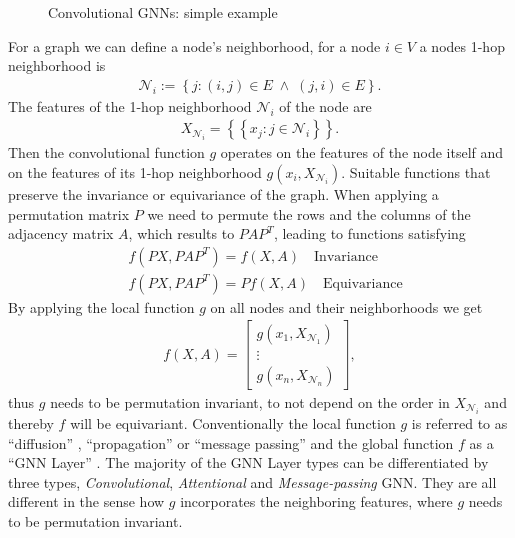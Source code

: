 \begin{figure}[htb!]
    \caption{Convolutional GNNs: simple example \label{fig: 4}}
\end{figure}

For a graph we can define a node's neighborhood, for a node $i \in V$ a
nodes 1-hop neighborhood is
\begin{align}
    \mathcal{N}_i := \left\{ j: (i,j) \in E\; \wedge \; (j, i) \in E
    \right\}.
\end{align}
The features of the 1-hop neighborhood $\mathcal{N}_i$ of the node are
\begin{align}
    X_{\mathcal{N}_i} = \left\{ \left\{ x_j: j \in \mathcal{N}_i \right\}
    \right\} .
\end{align}
Then the convolutional function $g$ operates on the features of the node
itself and on the features of its 1-hop neighborhood $g\left(x_i,
X_{\mathcal{N}_i}\right)$. Suitable functions that preserve the invariance
or equivariance of the graph. When applying a permutation matrix $P$ we need
to permute the rows and the columns of the adjacency matrix $A$, which
results to $PAP^{T}$, leading to functions satisfying
\begin{align}
    &f(PX, PAP^{T}) = f(X, A) \quad \text{Invariance}\\
    &f(PX, PAP^{T}) = Pf(X, A) \quad \text{Equivariance}
\end{align}
By applying the local function $g$ on all nodes and their neighborhoods we
get
\begin{align}
    f(X, A) =
    \begin{bmatrix}
        g(x_1, X_{\mathcal{N}_1})\\
        \vdots\\
        g(x_n, X_{\mathcal{N}_n})
    \end{bmatrix},
\end{align}
thus $g$ needs to be permutation invariant, to not depend on the order in
$X_{\mathcal{N}_i}$ and thereby $f$ will be equivariant. Conventionally the
local function $g$ is referred to as "`diffusion"' , "`propagation"' or
"`message passing"'
and the global function $f$ as a "`GNN Layer"' \cite[Chapter~5]{gnn_overview}.
The majority of the GNN Layer types can be
differentiated by three types, \textit{Convolutional}, \textit{Attentional}
and \textit{Message-passing} GNN. They are all different in the sense how $g$
incorporates the neighboring features, where $g$ needs to be permutation
invariant.
\newline

